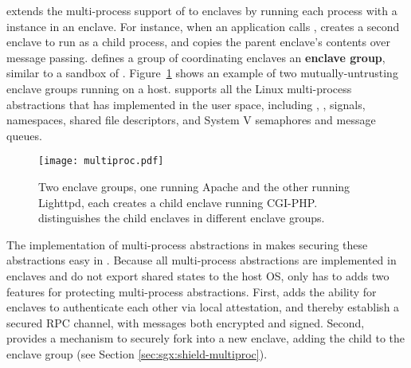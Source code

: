 \graphenesgx{} extends the multi-process support of \graphene{} to enclaves by running each
process with a \libos{} instance in an enclave.
For instance, when an application calls , \graphenesgx{} creates a second enclave to run as a child process,
and copies the parent enclave's contents over message passing.
\graphenesgx{} defines
a group of coordinating enclaves an {\bf enclave group},
similar to a sandbox of \graphene{}.
Figure~\ref{fig:multiproc-threats} shows an example of two mutually-untrusting enclave groups running on a host.
\graphenesgx{} supports all the Linux multi-process abstractions that \graphene{} has implemented in the user space,
including , , signals, namespaces, shared file descriptors, and System V semaphores and message queues.


\begin{figure}[t!]
\centering
\texttt{[image: multiproc.pdf]}
\caption{Two enclave groups, one running Apache and the other running Lighttpd, each creates a child enclave running CGI-PHP.
\graphenesgx{} distinguishes the child enclaves in different enclave groups.}
\label{fig:multiproc-threats}
\end{figure}



The implementation of multi-process abstractions in \graphene{}
makes securing these abstractions easy in \graphenesgx{}.
Because all multi-process abstractions are implemented in enclaves and
do not export shared states to the host OS,
\graphenesgx{} only has to adds two features for protecting multi-process abstractions.
First, \graphenesgx{} adds
the ability for enclaves to authenticate each other via local attestation,
and thereby establish a secured RPC channel,
with messages both encrypted and signed.
Second, \graphenesgx{} provides
a mechanism to securely fork into a new enclave, adding the child to the enclave group (see Section \ref{sec:sgx:shield-multiproc}).





